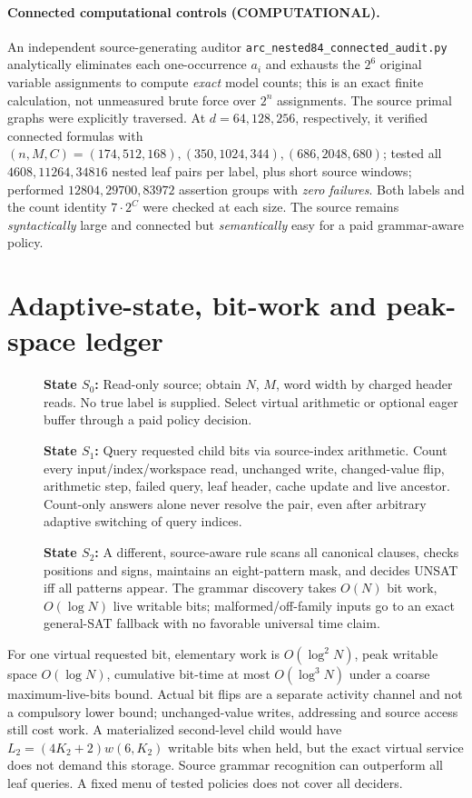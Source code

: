 \documentclass[11pt]{article}
\begin{document}
\paragraph{Connected computational controls (COMPUTATIONAL).}
An independent source-generating auditor \texttt{arc\_nested84\_connected\_audit.py} analytically eliminates each one-occurrence \(a_i\) and exhausts the \(2^6\) original variable assignments to compute \emph{exact} model counts; this is an exact finite calculation, not unmeasured brute force over \(2^n\) assignments. The source primal graphs were explicitly traversed. At \(d=64,128,256\), respectively, it verified connected formulas with \((n,M,C)=(174,512,168),(350,1024,344),(686,2048,680)\); tested all \(4608,11264,34816\) nested leaf pairs per label, plus short source windows; performed \(12804,29700,83972\) assertion groups with \emph{zero failures}. Both labels and the count identity \(7\cdot2^C\) were checked at each size. The source remains \emph{syntactically} large and connected but \emph{semantically} easy for a paid grammar-aware policy.

\section{Adaptive-state, bit-work and peak-space ledger}
\begin{description}
\item[] \textbf{State \(S_0\):} Read-only source; obtain \(N\), \(M\), word width by charged header reads. No true label is supplied. Select virtual arithmetic or optional eager buffer through a paid policy decision.
\item[] \textbf{State \(S_1\):} Query requested child bits via source-index arithmetic. Count every input/index/workspace read, unchanged write, changed-value flip, arithmetic step, failed query, leaf header, cache update and live ancestor. Count-only answers alone never resolve the pair, even after arbitrary adaptive switching of query indices.
\item[] \textbf{State \(S_2\):} A different, source-aware rule scans all canonical clauses, checks positions and signs, maintains an eight-pattern mask, and decides UNSAT iff all patterns appear. The grammar discovery takes \(O(N)\) bit work, \(O(\log N)\) live writable bits; malformed/off-family inputs go to an exact general-SAT fallback with no favorable universal time claim.
\end{description}
For one virtual requested bit, elementary work is \(O(\log^2N)\), peak writable space \(O(\log N)\), cumulative bit-time at most \(O(\log^3N)\) under a coarse maximum-live-bits bound. Actual bit flips are a separate activity channel and not a compulsory lower bound; unchanged-value writes, addressing and source access still cost work. A materialized second-level child would have \(L_2=(4K_2+2)w(6,K_2)\) writable bits when held, but the exact virtual service does not demand this storage. Source grammar recognition can outperform all leaf queries. A fixed menu of tested policies does not cover all deciders.
\end{document}
